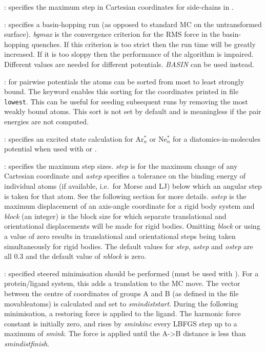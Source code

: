 : specifies the maximum step in Cartesian coordinates for side-chains
in {\/}.

: specifies a basin-hopping run (as opposed to standard MC
on the untransformed surface). {\it bgmax\/} is the convergence criterion
for the RMS force in the basin-hopping
quenches. If this criterion is too strict then the run time will be greatly increased.
If it is too sloppy then the performance of the algorithm is impaired. Different values
are needed for different potentials. {\it BASIN} can be used instead.

: for pairwise potentials the atoms can be sorted from most to least
strongly bound. The {} keyword enables this sorting for the coordinates printed
in file {\tt lowest}. This can be useful for seeding subsequent runs by removing the
most weakly bound atoms. This sort is not set by default and is meaningless if the
pair energies are not computed.

: specifies an excited state calculation for Ar$^*_n$ or Ne$^*_n$ for
a diatomics-in-molecules potential when used with {\/} or {\/}.

: specifies the maximum step sizes. {\it step\/} is
for the maximum change of any Cartesian coordinate and {\it astep\/} specifies a tolerance
on the binding energy of individual atoms (if available, i.e.~for Morse and LJ) below
which an angular step is taken for that atom. See the following section for more details.
{\it ostep\/} is the maximum displacement of an axis-angle coordinate for a rigid body system
and {\it block\/} (an integer) is the block size for which separate translational and orientational
displacements will be made for rigid bodies. Omitting {\it block\/} or using a value of zero results in
translational and orientational steps being taken simultaneously
for rigid bodies. The default values for {\it step\/},
{\it astep\/} and {\it ostep\/} are all 0.3 and the default value of {\it nblock\/} is zero.

: specified steered 
minimisation should be performed (must be used with {}). For a protein/ligand system, this adds a translation
to the MC move. The vector between the centre of coordinates of groups A and B (as defined in the file movableatoms)
is calculated and set to {\it smindiststart}. During the following minimisation, a restoring force is applied to 
the ligand. The harmonic force constant is initially zero, and rises by {\it sminkinc} every LBFGS step up to a
maximum of {\it smink}. The force is applied until the A->B distance is less than {\it smindistfinish}.  

